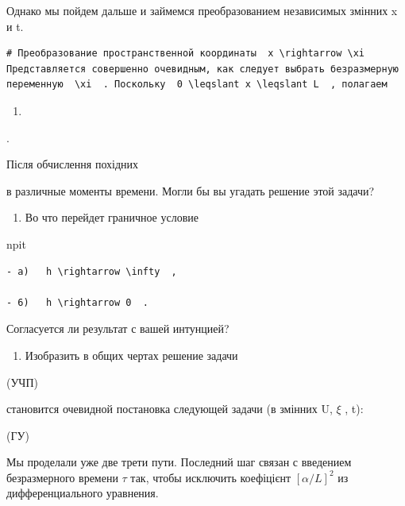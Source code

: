 \documentclass[
  ukrainian,
]{article}
\providecommand{\tightlist}{%
  \setlength{\itemsep}{0pt}\setlength{\parskip}{0pt}}
\begin{document}
Однако мы пойдем дальше и займемся преобразованием независимых змінних x
и t.

\begin{verbatim}
# Преобразование пространственной координаты  x \rightarrow \xi  Представляется совершенно очевидным, как следует выбрать безразмерную переменную  \xi  . Поскольку  0 \leqslant x \leqslant L  , полагаем
\end{verbatim}

\begin{enumerate}
\def\labelenumi{\arabic{enumi}.}
\tightlist
\item
\end{enumerate}

.

Після обчислення похідних

в различные моменты времени. Могли бы вы угадать решение этой задачи?

\begin{enumerate}
\def\labelenumi{\arabic{enumi}.}
\setcounter{enumi}{2}
\tightlist
\item
  Во что перейдет граничное условие
\end{enumerate}

npit

\begin{verbatim}
- a)   h \rightarrow \infty  ,

- 6)   h \rightarrow 0  .
\end{verbatim}

Согласуется ли результат с вашей интунцией?

\begin{enumerate}
\def\labelenumi{\arabic{enumi}.}
\setcounter{enumi}{3}
\tightlist
\item
  Изобразить в общих чертах решение задачи
\end{enumerate}

(УЧП)

становится очевидной постановка следующей задачи (в змінних U, \(\xi\) ,
t):

(ГУ)

Мы проделали уже две трети пути. Последний шаг связан с введением
безразмерного времени \(\tau\) так, чтобы исключить коефіцієнт
\([\alpha/L]^2\) из дифференциального уравнения.
\end{document}
